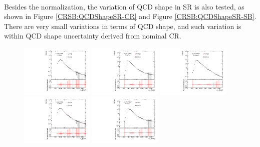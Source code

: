 \clearpage
\paragraph{}
Besides the normalization, the variation of QCD shape in SR is also tested, as shown in Figure \ref{CRSB:QCDShapeSR-CR} and Figure \ref{CRSB:QCDShapeSR-SB}. There are very small variations in terms of QCD shape, and such variation is within QCD shape uncertainty derived from nominal CR. 

\begin{figure}[htbp!]
\begin{center}
\includegraphics[angle=270, width=0.31\textwidth]{./figures/boosted/Syst_CRSB/CR_High_compare_FourTag_qcd_hh.pdf}
\includegraphics[angle=270, width=0.31\textwidth]{./figures/boosted/Syst_CRSB/CR_High_compare_ThreeTag_qcd_hh.pdf}
\includegraphics[angle=270, width=0.31\textwidth]{./figures/boosted/Syst_CRSB/CR_High_compare_TwoTag_split_qcd_hh.pdf}
\includegraphics[angle=270, width=0.31\textwidth]{./figures/boosted/Syst_CRSB/CR_Low_compare_FourTag_qcd_hh.pdf}
\includegraphics[angle=270, width=0.31\textwidth]{./figures/boosted/Syst_CRSB/CR_Low_compare_ThreeTag_qcd_hh.pdf}

\end{center}
\end{figure}
